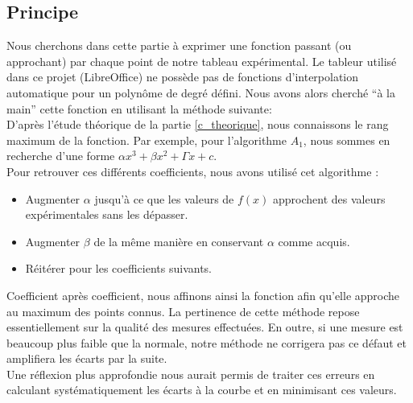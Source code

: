 
\subsection{Principe}
 Nous cherchons dans cette partie à exprimer une fonction passant (ou approchant) par chaque point de notre tableau expérimental. Le tableur utilisé dans ce projet (LibreOffice) ne possède pas de fonctions d'interpolation automatique pour un polynôme de degré défini.
 Nous avons alors cherché ``à la main'' cette fonction en utilisant la méthode suivante: \vspace{1cm}\\
 
 D'après l'étude théorique de la partie \ref{c_theorique}, nous connaissons le rang maximum de la fonction. Par exemple, pour l'algorithme $A_1$, nous sommes en recherche d'une forme $\alpha x^3 + \beta x^2 + \Gamma x + c$.\\
 Pour retrouver ces différents coefficients, nous avons utilisé cet algorithme :
 \begin{itemize}
  \item Augmenter $\alpha$ jusqu'à ce que les valeurs de $f(x)$ approchent des valeurs expérimentales sans les dépasser.
  \item Augmenter $\beta$ de la même manière en conservant $\alpha$ comme acquis.
  \item Réitérer pour les coefficients suivants.
 \end{itemize}
Coefficient après coefficient, nous affinons ainsi la fonction afin qu'elle approche au maximum des points connus. La pertinence de cette méthode repose essentiellement sur la qualité des mesures effectuées. En outre, si une mesure est beaucoup plus faible que la normale, notre méthode ne corrigera pas ce défaut et amplifiera les écarts par la suite.\\
Une réflexion plus approfondie nous aurait permis de traiter ces erreurs en calculant systématiquement les écarts à la courbe et en minimisant ces valeurs.
